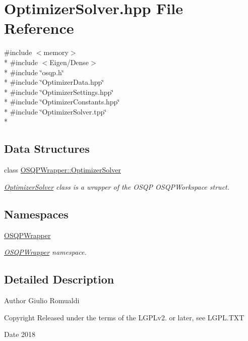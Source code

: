 \section{Optimizer\+Solver.\+hpp File Reference}
\label{OptimizerSolver_8hpp}
{\ttfamily \#include $<$memory$>$}\\*
{\ttfamily \#include $<$Eigen/\+Dense$>$}\\*
{\ttfamily \#include \char`\"{}osqp.\+h\char`\"{}}\\*
{\ttfamily \#include \char`\"{}Optimizer\+Data.\+hpp\char`\"{}}\\*
{\ttfamily \#include \char`\"{}Optimizer\+Settings.\+hpp\char`\"{}}\\*
{\ttfamily \#include \char`\"{}Optimizer\+Constants.\+hpp\char`\"{}}\\*
{\ttfamily \#include \char`\"{}Optimizer\+Solver.\+tpp\char`\"{}}\\*
\subsection*{Data Structures}
\begin{DoxyCompactItemize}
\item 
class \hyperlink{classOSQPWrapper_1_1OptimizerSolver}{O\+S\+Q\+P\+Wrapper\+::\+Optimizer\+Solver}
\begin{DoxyCompactList}\small\item\em \hyperlink{classOSQPWrapper_1_1OptimizerSolver}{Optimizer\+Solver} class is a wrapper of the O\+S\+QP O\+S\+Q\+P\+Workspace struct. \end{DoxyCompactList}\end{DoxyCompactItemize}
\subsection*{Namespaces}
\begin{DoxyCompactItemize}
\item 
 \hyperlink{namespaceOSQPWrapper}{O\+S\+Q\+P\+Wrapper}
\begin{DoxyCompactList}\small\item\em \hyperlink{namespaceOSQPWrapper}{O\+S\+Q\+P\+Wrapper} namespace. \end{DoxyCompactList}\end{DoxyCompactItemize}


\subsection{Detailed Description}
\begin{DoxyAuthor}{Author}
Giulio Romualdi 
\end{DoxyAuthor}
\begin{DoxyCopyright}{Copyright}
Released under the terms of the L\+G\+P\+Lv2. or later, see L\+G\+P\+L.\+T\+XT 
\end{DoxyCopyright}
\begin{DoxyDate}{Date}
2018 
\end{DoxyDate}

